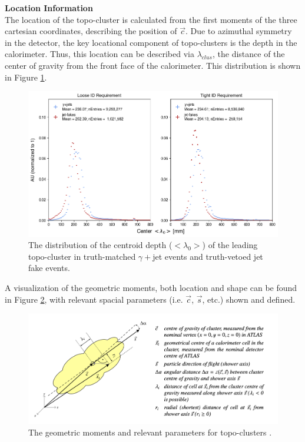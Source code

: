 \noindent\textbf{Location Information}\\
\indent The location of the topo-cluster is calculated from the first moments of the three cartesian coordinates, describing the position of $\vec{c}$. Due to azimuthal symmetry in the detector, the key locational component of topo-clusters is the depth in the calorimeter. Thus, this location can be described via $\lambda_{clus}$, the distance of the center of gravity from the front face of the calorimeter. This distribution is shown in Figure \ref{fig:topo-centerLambda}.

\begin{figure}
    \centering 
    \includegraphics[width=\textwidth]{chapters/chapter4_photonID/images/hists/y_topoCluster0_centerLambda.png}
    \caption[The distribution of the centroid depth ($<\lambda_{0}>$) of the leading topo-cluster]{The distribution of the centroid depth ($<\lambda_{0}>$) of the leading topo-cluster in truth-matched $\gamma+$jet events and truth-vetoed jet fake events.}
    \label{fig:topo-centerLambda}
\end{figure}

A visualization of the geometric moments, both location and shape can be found in Figure \ref{fig:topo-geom}, with relevant spacial parameters (i.e. $\vec{c}$, $\vec{s}$, etc.) shown and defined.

\begin{figure}[htb]
    \centering
    \includegraphics[width=.90\textwidth]{chapters/chapter4_photonID/images/geom-moments.png}

    \caption[The geometric moments and relevant parameters for topo-clusters.]
    {The geometric moments and relevant parameters for topo-clusters \cite{topo-clustering-r1}.}
    \label{fig:topo-geom}
\end{figure}



